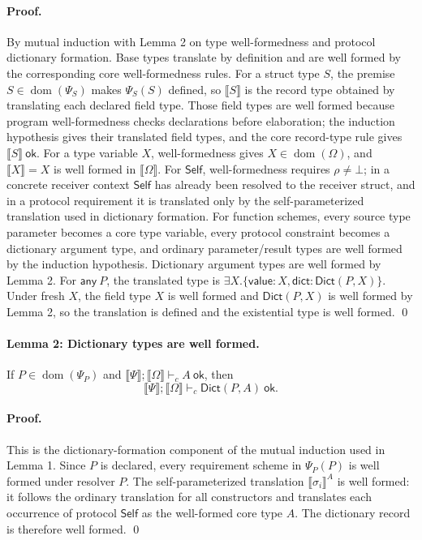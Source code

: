 \documentclass[manuscript,nonacm]{acmart}
\newcommand{\kw}[1]{\ensuremath{\mathsf{#1}}}
\newcommand{\Self}{\kw{Self}\xspace}
\newcommand{\Any}[1]{\kw{any}\ #1}
\newcommand{\ok}{\ \kw{ok}}
\newcommand{\dom}{\operatorname{dom}}
\newcommand{\has}{\vdash}
\newcommand{\trans}[1]{\llbracket #1 \rrbracket}
\newcommand{\transSelf}[2]{\llbracket #2 \rrbracket^{#1}}
\newcommand{\Dict}{\mathsf{Dict}}
\begin{document}
\paragraph{Proof.}
By mutual induction with Lemma 2 on type well-formedness and protocol dictionary formation.
Base types translate by definition and are well formed by the corresponding core well-formedness rules.
For a struct type $S$, the premise $S\in\dom(\Psi_S)$ makes $\Psi_S(S)$ defined, so $\trans{S}$ is the record type obtained by translating each declared field type.
Those field types are well formed because program well-formedness checks declarations before elaboration; the induction hypothesis gives their translated field types, and the core record-type rule gives $\trans{S}\ok$.
For a type variable $X$, well-formedness gives $X\in\dom(\Omega)$, and $\trans{X}=X$ is well formed in $\trans{\Omega}$.
For \Self, well-formedness requires $\rho\neq\bot$; in a concrete receiver context \Self has already been resolved to the receiver struct, and in a protocol requirement it is translated only by the self-parameterized translation used in dictionary formation.
For function schemes, every source type parameter becomes a core type variable, every protocol constraint becomes a dictionary argument type, and ordinary parameter/result types are well formed by the induction hypothesis.
Dictionary argument types are well formed by Lemma 2.
For $\Any{P}$, the translated type is $\exists X.\{\kw{value}:X,\kw{dict}:\Dict(P,X)\}$.
Under fresh $X$, the field type $X$ is well formed and $\Dict(P,X)$ is well formed by Lemma 2, so the translation is defined and the existential type is well formed.
\qed

\paragraph{Lemma 2: Dictionary types are well formed.}
If $P\in\dom(\Psi_P)$ and $\trans{\Psi};\trans{\Omega}\has_c A\ok$, then
\[
  \trans{\Psi};\trans{\Omega}\has_c\Dict(P,A)\ok.
\]

\paragraph{Proof.}
This is the dictionary-formation component of the mutual induction used in Lemma 1.
Since $P$ is declared, every requirement scheme in $\Psi_P(P)$ is well formed under resolver $P$.
The self-parameterized translation $\transSelf{A}{\sigma_i}$ is well formed: it follows the ordinary translation for all constructors and translates each occurrence of protocol \Self as the well-formed core type $A$.
The dictionary record is therefore well formed.
\qed
\end{document}
